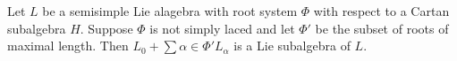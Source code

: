 Let $L$ be a semisimple Lie alagebra with root system $\Phi$ with respect to
a Cartan subalgebra $H$. Suppose $\Phi$ is not simply laced and let $\Phi'$
be the subset of roots of maximal length. Then $L_0 + \sum{\alpha \in \Phi'}L_\alpha$
is a Lie subalgebra of $L$.
